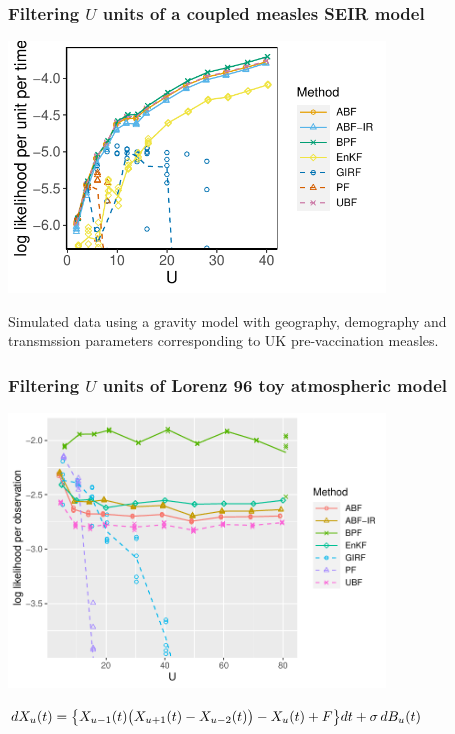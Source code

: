 \documentclass{beamer}
\begin{document}
\begin{frame}
\frametitle{Filtering $U$ units of a coupled measles SEIR model}

\vspace{-3mm}

\begin{center}
\includegraphics[width=10cm]{mscale_loglik_plot-1.pdf}


\end{center}

\vspace{-2mm}

Simulated data using a gravity model with geography, demography and transmssion parameters corresponding to UK pre-vaccination measles.


\end{frame}


\begin{frame}
\frametitle{Filtering $U$ units of Lorenz 96 toy atmospheric model} 

\vspace{-3mm}

\begin{center}
\includegraphics[width=10cm]{lz4_loglik_plot-1.pdf}

\vspace{-1mm}

$dX_{u}(t) = \big \{  X_{u-1}(t) \big(X_{u+1}(t) - X_{u-2}(t)\big) - X_{u}(t) + F \big\} dt + \sigma \, dB_{u}(t)$

\end{center}

\end{frame}
\end{document}
